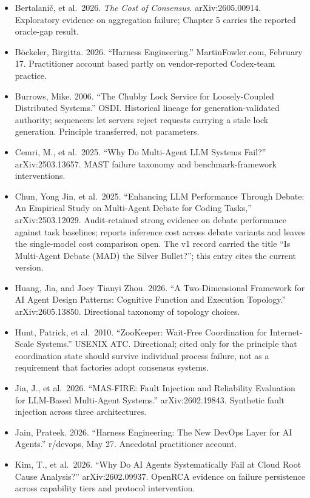 \begin{itemize}
\tightlist
\item
  Bertalani\v{c}, et al.~2026. \emph{The Cost of Consensus}. arXiv:2605.00914. Exploratory evidence on aggregation failure; Chapter 5 carries the reported oracle-gap result.
\item
  Böckeler, Birgitta. 2026. ``Harness Engineering.'' MartinFowler.com, February 17. Practitioner account based partly on vendor-reported Codex-team practice.
\item
  Burrows, Mike. 2006. ``The Chubby Lock Service for Loosely-Coupled Distributed Systems.'' OSDI. Historical lineage for generation-validated authority; sequencers let servers reject requests carrying a stale lock generation. Principle transferred, not parameters.
\item
  Cemri, M., et al.~2025. ``Why Do Multi-Agent LLM Systems Fail?'' arXiv:2503.13657. MAST failure taxonomy and benchmark-framework interventions.
\item
  Chun, Yong Jin, et al.~2025. ``Enhancing LLM Performance Through Debate: An Empirical Study on Multi-Agent Debate for Coding Tasks,'' arXiv:2503.12029. Audit-retained strong evidence on debate performance against task baselines; reports inference cost across debate variants and leaves the single-model cost comparison open. The v1 record carried the title ``Is Multi-Agent Debate (MAD) the Silver Bullet?''; this entry cites the current version.
\item
  Huang, Jia, and Joey Tianyi Zhou. 2026. ``A Two-Dimensional Framework for AI Agent Design Patterns: Cognitive Function and Execution Topology.'' arXiv:2605.13850. Directional taxonomy of topology choices.
\item
  Hunt, Patrick, et al.~2010. ``ZooKeeper: Wait-Free Coordination for Internet-Scale Systems.'' USENIX ATC. Directional; cited only for the principle that coordination state should survive individual process failure, not as a requirement that factories adopt consensus systems.
\item
  Jia, J., et al.~2026. ``MAS-FIRE: Fault Injection and Reliability Evaluation for LLM-Based Multi-Agent Systems.'' arXiv:2602.19843. Synthetic fault injection across three architectures.
\item
  Jain, Prateek. 2026. ``Harness Engineering: The New DevOps Layer for AI Agents.'' r/devops, May 27. Anecdotal practitioner account.
\item
  Kim, T., et al.~2026. ``Why Do AI Agents Systematically Fail at Cloud Root Cause Analysis?'' arXiv:2602.09937. OpenRCA evidence on failure persistence across capability tiers and protocol intervention.

\end{itemize}
